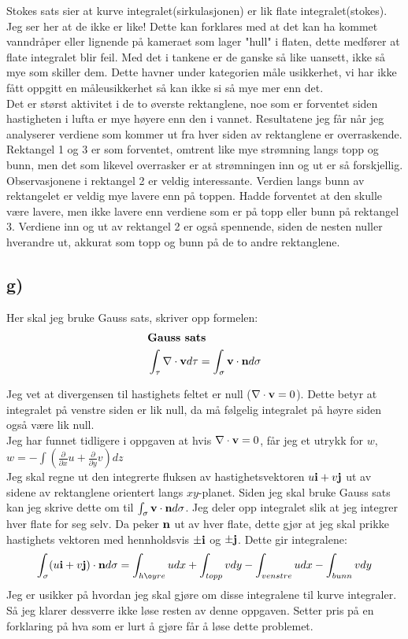 \documentclass[a4paper,12pt,norsk]{article}
\begin{document}
Stokes sats sier at kurve integralet(sirkulasjonen) er lik flate integralet(stokes). Jeg ser her at de ikke er like! Dette kan forklares med at det kan ha kommet vanndråper eller lignende på kameraet som lager "hull" i flaten, dette medfører at flate integralet blir feil. Med det i tankene er de ganske så like uansett, ikke så mye som skiller dem. Dette havner under kategorien måle usikkerhet, vi har ikke fått oppgitt en måleusikkerhet så kan ikke si så mye mer enn det. \\
Det er størst aktivitet i de to øverste rektanglene, noe som er forventet siden hastigheten i lufta er mye høyere enn den i vannet. Resultatene jeg får når jeg analyserer verdiene som kommer ut fra hver siden av rektanglene er overraskende.\\
Rektangel 1 og 3 er som forventet, omtrent like mye strømning langs topp og bunn, men det som likevel overrasker er at strømningen inn og ut er så forskjellig. Observasjonene i rektangel 2 er veldig interessante. Verdien langs bunn av rektangelet er veldig mye lavere enn på toppen. Hadde forventet at den skulle være lavere, men ikke lavere enn verdiene som er på topp eller bunn på rektangel 3. Verdiene inn og ut av rektangel 2 er også spennende, siden de nesten nuller hverandre ut, akkurat som topp og bunn på de to andre rektanglene. 

\subsection*{g)}
Her skal jeg bruke Gauss sats, skriver opp formelen:
\begin{align*}
&\textbf{Gauss sats}\\
&\int_{\tau} \nabla \cdot \bold{v}d\tau = \int_\sigma \bold{v} \cdot \bold{n}d\sigma
\end{align*}

Jeg vet at divergensen til hastighets feltet er null ($\nabla \cdot \bold{v}=0$). Dette betyr at integralet på venstre siden er lik null, da må følgelig integralet på høyre siden også være lik null.\\ 
Jeg har funnet tidligere i oppgaven at hvis $\nabla \cdot \bold{v}=0$, får jeg et utrykk for $w$, $w = -\int (\frac{\partial}{\partial{x}}u +\frac{\partial}{\partial{y}}v)dz$\\
Jeg skal regne ut den integrerte fluksen av hastighetsvektoren $u\bold{i} + v\bold{j}$ ut av sidene av rektanglene orientert langs $xy$-planet. Siden jeg skal bruke Gauss sats kan jeg skrive dette om til $\int_\sigma \bold{v} \cdot \bold{n}d\sigma$. Jeg deler opp integralet slik at jeg integrer hver flate for seg selv. Da peker $\bold{n}$ ut av hver flate, dette gjør at jeg skal prikke hastighets vektoren med hennholdsvis $\pm \bold{i}$ og $\pm \bold{j}$. Dette gir integralene:
\begin{align*}
\int_\sigma (u\bold{i}+v\bold{j}) \cdot \bold{n}d\sigma = \int_{høyre} udx + \int_{topp} vdy -\int_{venstre} udx - \int_{bunn} vdy
\end{align*}
Jeg er usikker på hvordan jeg skal gjøre om disse integralene til kurve integraler. Så jeg klarer dessverre ikke løse resten av denne oppgaven. Setter pris på en forklaring på hva som er lurt å gjøre får å løse dette problemet.
\end{document}

